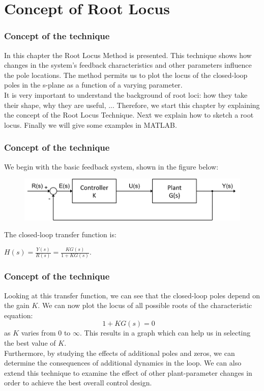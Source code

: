 \section{Concept of Root Locus}

\begin{frame}
\frametitle{Concept of the technique}
\justify
In this chapter the Root Locus Method is presented. This technique shows how changes in the system's feedback characteristics and other parameters influence the pole locations. The method permits us to plot the locus of the closed-loop poles in the s-plane as a function of a varying parameter.\\
\vspace{1em}
It is very important to understand the background of root loci: how they take their shape, why they are useful, ... Therefore, we start this chapter by explaining the concept of the Root Locus Technique. Next we explain how to sketch a root locus. Finally we will give some examples in MATLAB.

\end{frame}

\begin{frame}
\frametitle{Concept of the technique}
\justify
	We begin with the basic feedback system, shown in the figure below:
	\begin{figure}
		\centering
		\includegraphics[width=1\linewidth]{closed_loop_diagram}
	\end{figure}
	The closed-loop transfer function is:
	\begin{center}
		$H(s) = \frac{Y(s)}{R(s)} = \frac{KG(s)}{1 + KG(s)}$.
	\end{center}
\end{frame}

\begin{frame}
\frametitle{Concept of the technique}
\justify
	Looking at this transfer function, we can see that the closed-loop poles depend on the gain $K$. We can now plot the locus of all possible roots of the characteristic equation: 
	\begin{equation}
		1 + KG(s) = 0 \hspace{1em}
	\end{equation}
	as $K$ varies from $0$ to $\infty$. This results in a graph which can help us in selecting the best value of $K$.\\
	\vspace{1em}
	Furthermore, by studying the effects of additional poles and zeros, we can determine the consequences of additional dynamics in the loop. We can also extend this technique to examine the effect of other plant-parameter changes in order to achieve the best overall control design.
\end{frame}

